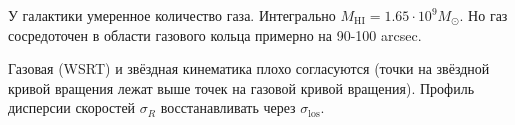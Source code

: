 \documentclass[english,10pt]{article}
\def\mm{\mathrm}
\begin{document}
\bigskip
\noindent
У галактики умеренное количество газа. Интегрально $M_\mm{HI} = 1.65 \cdot 
10^{9} M_\odot$. Но газ сосредоточен в области газового кольца примерно на 
90-100 arcsec. 

\bigskip
\noindent
Газовая (WSRT) и звёздная кинематика плохо согласуются (точки на 
звёздной кривой вращения лежат выше точек на газовой кривой 
вращения). Профиль дисперсии скоростей $\sigma_R$ восстанавливать 
через $\sigma_\mm{los}$.
\end{document}

